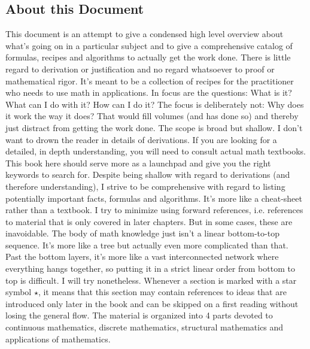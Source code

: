 \subsection{About this Document}
This document is an attempt to give a condensed high level overview about what's going on in a particular subject and to give a comprehensive catalog of formulas, recipes and algorithms to actually get the work done. There is little regard to derivation or justification and no regard whatsoever to proof or mathematical rigor. It's meant to be a collection of recipes for the practitioner who needs to use math in applications. In focus are the questions: What is it? What can I do with it? How can I do it? The focus is deliberately not: Why does it work the way it does? That would fill volumes (and has done so) and thereby just distract from getting the work done. The scope is broad but shallow. I don't want to drown the reader in details of derivations. If you are looking for a detailed, in depth understanding, you will need to consult actual math textbooks. This book here should serve more as a launchpad and give you the right keywords to search for.  Despite being shallow with regard to derivations (and therefore understanding), I strive to be comprehensive with regard to listing potentially important facts, formulas and algorithms. It's more like a cheat-sheet rather than a textbook. I try to minimize using forward references, i.e. references to material that is only covered in later chapters. But in some cases, these are inavoidable. The body of math knowledge just isn't a linear bottom-to-top sequence. It's more like a tree but actually even more complicated than that. Past the bottom layers, it's more like a vast interconnected network where everything hangs together, so putting it in a strict linear order from bottom to top is difficult. I will try nonetheless. Whenever a section is marked with a star symbol $\star$, it means that this section may contain references to ideas that are introduced only later in the book and can be skipped on a first reading without losing the general flow. The material is organized into 4 parts devoted to continuous mathematics, discrete mathematics, structural mathematics and applications of mathematics. 





